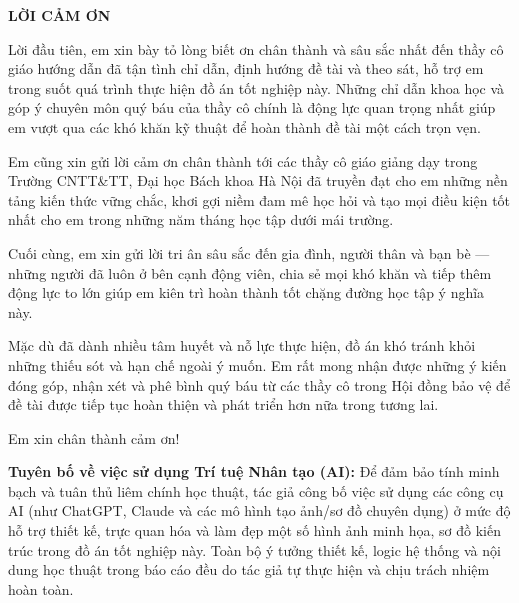 \documentclass[../DoAn.tex]{subfiles}
\begin{document}
\begin{center}
    \Large{\textbf{LỜI CẢM ƠN}}\\
\end{center}
\vspace{1cm}

Lời đầu tiên, em xin bày tỏ lòng biết ơn chân thành và sâu sắc nhất đến thầy cô giáo hướng dẫn đã tận tình chỉ dẫn, định hướng đề tài và theo sát, hỗ trợ em trong suốt quá trình thực hiện đồ án tốt nghiệp này. Những chỉ dẫn khoa học và góp ý chuyên môn quý báu của thầy cô chính là động lực quan trọng nhất giúp em vượt qua các khó khăn kỹ thuật để hoàn thành đề tài một cách trọn vẹn.

Em cũng xin gửi lời cảm ơn chân thành tới các thầy cô giáo giảng dạy trong Trường CNTT\&TT, Đại học Bách khoa Hà Nội đã truyền đạt cho em những nền tảng kiến thức vững chắc, khơi gợi niềm đam mê học hỏi và tạo mọi điều kiện tốt nhất cho em trong những năm tháng học tập dưới mái trường.

Cuối cùng, em xin gửi lời tri ân sâu sắc đến gia đình, người thân và bạn bè — những người đã luôn ở bên cạnh động viên, chia sẻ mọi khó khăn và tiếp thêm động lực to lớn giúp em kiên trì hoàn thành tốt chặng đường học tập ý nghĩa này.

Mặc dù đã dành nhiều tâm huyết và nỗ lực thực hiện, đồ án khó tránh khỏi những thiếu sót và hạn chế ngoài ý muốn. Em rất mong nhận được những ý kiến đóng góp, nhận xét và phê bình quý báu từ các thầy cô trong Hội đồng bảo vệ để đề tài được tiếp tục hoàn thiện và phát triển hơn nữa trong tương lai.

Em xin chân thành cảm ơn!

\vspace{1cm}
\noindent\textbf{Tuyên bố về việc sử dụng Trí tuệ Nhân tạo (AI):} Để đảm bảo tính minh bạch và tuân thủ liêm chính học thuật, tác giả công bố việc sử dụng các công cụ AI (như ChatGPT, Claude và các mô hình tạo ảnh/sơ đồ chuyên dụng) ở mức độ hỗ trợ thiết kế, trực quan hóa và làm đẹp một số hình ảnh minh họa, sơ đồ kiến trúc trong đồ án tốt nghiệp này. Toàn bộ ý tưởng thiết kế, logic hệ thống và nội dung học thuật trong báo cáo đều do tác giả tự thực hiện và chịu trách nhiệm hoàn toàn.
\end{document}
